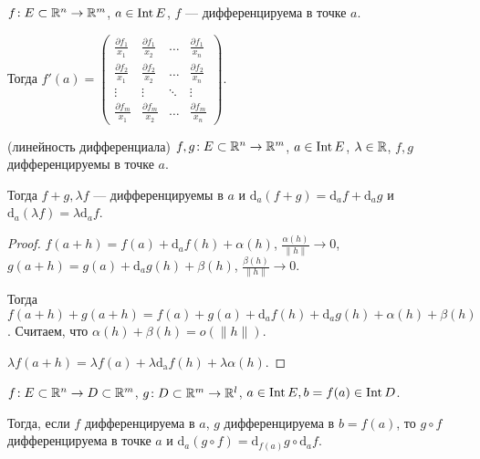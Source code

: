 \begin{consequence}
    $f\!: E \subset \mathbb{R}^n \to \mathbb{R}^m$,  $a \in \operatorname{Int} E$,  $f$ --- дифференцируема в точке  $a$.

    Тогда  $f'(a) = 
    \begin{pmatrix} 
    \frac{\partial f_1}{x_1} & \frac{\partial f_1}{x_2} & \ldots & \frac{\partial f_1}{x_n}\\
    \frac{\partial f_2}{x_1} &\frac{\partial f_2}{x_2} & \ldots &\frac{\partial f_2}{x_n}\\ 
    \vdots & \vdots & \ddots & \vdots\\ 
    \frac{\partial f_m}{x_1} & \frac{\partial f_m}{x_2} & \ldots & \frac{\partial f_m}{x_n} 
    \end{pmatrix}$.
\end{consequence}
\begin{theorem}(линейность дифференциала)
    $f, g\!: E \subset \mathbb{R}^n \to \mathbb{R}^m$,  $a \in \operatorname{Int} E$,  $\lambda \in \mathbb{R}$, $f, g$ дифференцируемы в точке $a$.

    Тогда $f + g, \lambda f$ --- дифференцируемы в  $a$ и $\mathrm{d}_a(f+g) = \mathrm{d}_af + \mathrm{d}_ag $ и $\mathrm{d}_a(\lambda f) = \lambda \mathrm{d}_a f$.
\end{theorem}
\begin{proof}
    $f(a+h) = f(a) + \mathrm{d}_af(h) + \alpha(h)$, $\frac{\alpha(h)}{\|h\|} \to 0$, $g(a + h) = g(a) + \mathrm{d}_ag(h) + \beta(h)$, $\frac{\beta(h)}{\|h\|} \to 0$.

    Тогда $f(a+h) + g(a+h) = f(a) + g(a) + \mathrm{d}_af(h) + \mathrm{d}_ag(h) + \alpha(h) + \beta(h)$. Считаем, что  $\alpha(h) + \beta(h) = o(\|h\|)$.

     $\lambda f(a+h) = \lambda f(a) + \lambda \mathrm{d_a}f(h) + \lambda\alpha(h)$.
\end{proof}
\begin{theorem}
    $f\!: E \subset \mathbb{R}^n \to D \subset \mathbb{R}^m$, $g\!: D \subset \mathbb{R}^m \to \mathbb{R}^l$,  $a \in \operatorname{Int} E, b = f(a) \in \operatorname{Int} D$.

    Тогда, если  $f$ дифференцируема в  $a$,  $g$ дифференцируема в  $b = f(a)$, то  $g \circ f$ дифференцируема в точке  $a$ и  $\mathrm{d}_a(g \circ f) = \mathrm{d}_{f(a)}g \circ \mathrm{d}_af$.
\end{theorem}
